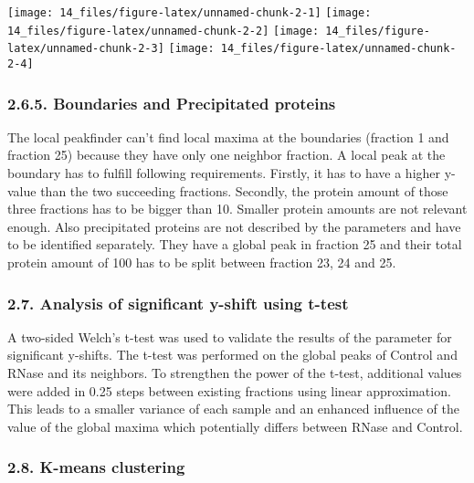 \documentclass[
  12pt,
]{article}
\begin{document}
\texttt{[image: 14\_files/figure-latex/unnamed-chunk-2-1]}
\texttt{[image: 14\_files/figure-latex/unnamed-chunk-2-2]}
\texttt{[image: 14\_files/figure-latex/unnamed-chunk-2-3]}
\texttt{[image: 14\_files/figure-latex/unnamed-chunk-2-4]}

\hypertarget{boundaries-and-precipitated-proteins}{%
\subsubsection{2.6.5. Boundaries and Precipitated
proteins}\label{boundaries-and-precipitated-proteins}}

The local peakfinder can't find local maxima at the boundaries (fraction
1 and fraction 25) because they have only one neighbor fraction. A local
peak at the boundary has to fulfill following requirements. Firstly, it
has to have a higher y-value than the two succeeding fractions.
Secondly, the protein amount of those three fractions has to be bigger
than 10. Smaller protein amounts are not relevant enough. Also
precipitated proteins are not described by the parameters and have to be
identified separately. They have a global peak in fraction 25 and their
total protein amount of 100 has to be split between fraction 23, 24 and
25.

\hypertarget{analysis-of-significant-y-shift-using-t-test}{%
\subsubsection{2.7. Analysis of significant y-shift using
t-test}\label{analysis-of-significant-y-shift-using-t-test}}

A two-sided Welch's t-test was used to validate the results of the
parameter for significant y-shifts. The t-test was performed on the
global peaks of Control and RNase and its neighbors. To strengthen the
power of the t-test, additional values were added in 0.25 steps between
existing fractions using linear approximation. This leads to a smaller
variance of each sample and an enhanced influence of the value of the
global maxima which potentially differs between RNase and Control.

\hypertarget{k-means-clustering}{%
\subsubsection{2.8. K-means clustering}\label{k-means-clustering}}
\end{document}
